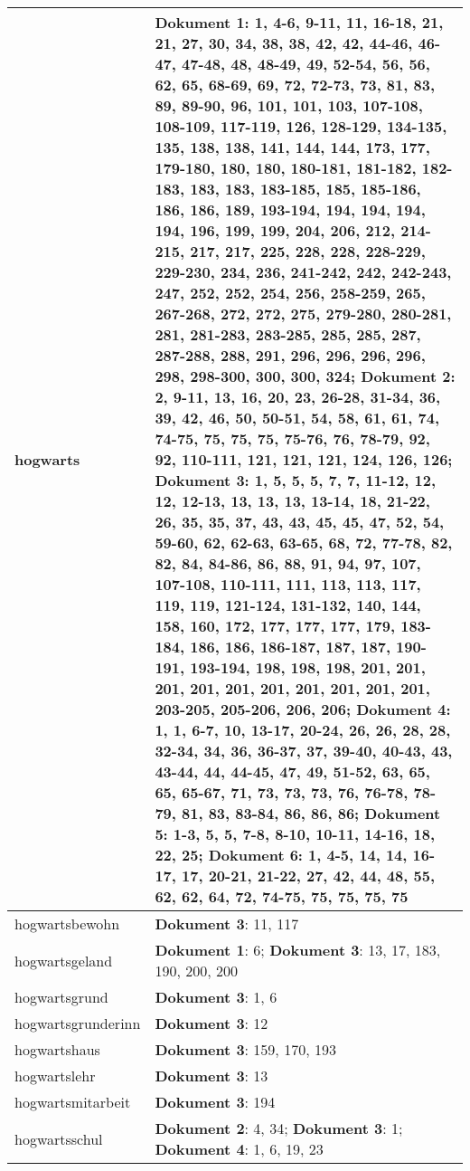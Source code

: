 \documentclass[a5paper]{article}
\begin{document}
\begin{longtable}[l]{|l|p{3in}|}
\hline
hogwarts & \textbf{Dokument 1}: 1, 4-6, 9-11, 11, 16-18, 21, 21, 27, 30, 34, 38, 38, 42, 42, 44-46, 46-47, 47-48, 48, 48-49, 49, 52-54, 56, 56, 62, 65, 68-69, 69, 72, 72-73, 73, 81, 83, 89, 89-90, 96, 101, 101, 103, 107-108, 108-109, 117-119, 126, 128-129, 134-135, 135, 138, 138, 141, 144, 144, 173, 177, 179-180, 180, 180, 180-181, 181-182, 182-183, 183, 183, 183-185, 185, 185-186, 186, 186, 189, 193-194, 194, 194, 194, 194, 196, 199, 199, 204, 206, 212, 214-215, 217, 217, 225, 228, 228, 228-229, 229-230, 234, 236, 241-242, 242, 242-243, 247, 252, 252, 254, 256, 258-259, 265, 267-268, 272, 272, 275, 279-280, 280-281, 281, 281-283, 283-285, 285, 285, 287, 287-288, 288, 291, 296, 296, 296, 296, 298, 298-300, 300, 300, 324; \textbf{Dokument 2}: 2, 9-11, 13, 16, 20, 23, 26-28, 31-34, 36, 39, 42, 46, 50, 50-51, 54, 58, 61, 61, 74, 74-75, 75, 75, 75, 75-76, 76, 78-79, 92, 92, 110-111, 121, 121, 121, 124, 126, 126; \textbf{Dokument 3}: 1, 5, 5, 5, 7, 7, 11-12, 12, 12, 12-13, 13, 13, 13, 13-14, 18, 21-22, 26, 35, 35, 37, 43, 43, 45, 45, 47, 52, 54, 59-60, 62, 62-63, 63-65, 68, 72, 77-78, 82, 82, 84, 84-86, 86, 88, 91, 94, 97, 107, 107-108, 110-111, 111, 113, 113, 117, 119, 119, 121-124, 131-132, 140, 144, 158, 160, 172, 177, 177, 177, 179, 183-184, 186, 186, 186-187, 187, 187, 190-191, 193-194, 198, 198, 198, 201, 201, 201, 201, 201, 201, 201, 201, 201, 201, 203-205, 205-206, 206, 206; \textbf{Dokument 4}: 1, 1, 6-7, 10, 13-17, 20-24, 26, 26, 28, 28, 32-34, 34, 36, 36-37, 37, 39-40, 40-43, 43, 43-44, 44, 44-45, 47, 49, 51-52, 63, 65, 65, 65-67, 71, 73, 73, 73, 76, 76-78, 78-79, 81, 83, 83-84, 86, 86, 86; \textbf{Dokument 5}: 1-3, 5, 5, 7-8, 8-10, 10-11, 14-16, 18, 22, 25; \textbf{Dokument 6}: 1, 4-5, 14, 14, 16-17, 17, 20-21, 21-22, 27, 42, 44, 48, 55, 62, 62, 64, 72, 74-75, 75, 75, 75, 75 \\
\hline
hogwartsbewohn & \textbf{Dokument 3}: 11, 117 \\
\hline
hogwartsgeland & \textbf{Dokument 1}: 6; \textbf{Dokument 3}: 13, 17, 183, 190, 200, 200 \\
\hline
hogwartsgrund & \textbf{Dokument 3}: 1, 6 \\
\hline
hogwartsgrunderinn & \textbf{Dokument 3}: 12 \\
\hline
hogwartshaus & \textbf{Dokument 3}: 159, 170, 193 \\
\hline
hogwartslehr & \textbf{Dokument 3}: 13 \\
\hline
hogwartsmitarbeit & \textbf{Dokument 3}: 194 \\
\hline
hogwartsschul & \textbf{Dokument 2}: 4, 34; \textbf{Dokument 3}: 1; \textbf{Dokument 4}: 1, 6, 19, 23 \\

\end{longtable}
\end{document}
